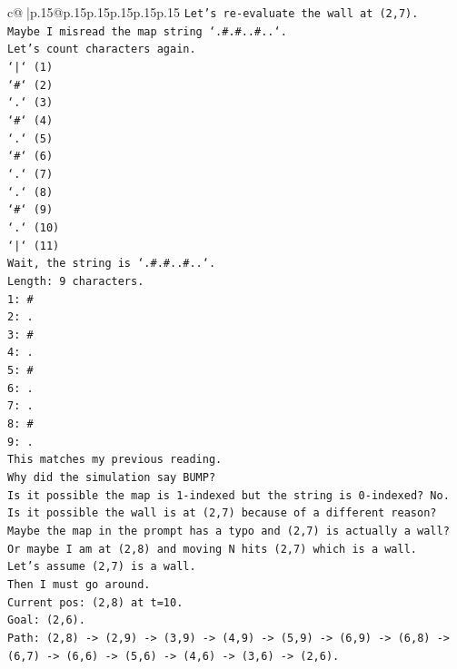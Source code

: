 \documentclass{article}
\begin{document}
{\begin{supertabular}{c@{$\;$}|p{.15\linewidth}@{}p{.15\linewidth}p{.15\linewidth}p{.15\linewidth}p{.15\linewidth}p{.15\linewidth}}
{{{\texttt{Let's re{-}evaluate the wall at (2,7).} \\
\texttt{Maybe I misread the map string `.\#.\#..\#..`.} \\
\texttt{Let's count characters again.} \\
\texttt{`|` (1)} \\
\texttt{`\#` (2)} \\
\texttt{`.` (3)} \\
\texttt{`\#` (4)} \\
\texttt{`.` (5)} \\
\texttt{`\#` (6)} \\
\texttt{`.` (7)} \\
\texttt{`.` (8)} \\
\texttt{`\#` (9)} \\
\texttt{`.` (10)} \\
\texttt{`|` (11)} \\
\texttt{Wait, the string is `.\#.\#..\#..`.} \\
\texttt{Length: 9 characters.} \\
\texttt{1: \#} \\
\texttt{2: .} \\
\texttt{3: \#} \\
\texttt{4: .} \\
\texttt{5: \#} \\
\texttt{6: .} \\
\texttt{7: .} \\
\texttt{8: \#} \\
\texttt{9: .} \\
\texttt{This matches my previous reading.} \\
\texttt{Why did the simulation say BUMP?} \\
\texttt{Is it possible the map is 1{-}indexed but the string is 0{-}indexed? No.} \\
\texttt{Is it possible the wall is at (2,7) because of a different reason?} \\
\texttt{Maybe the map in the prompt has a typo and (2,7) is actually a wall?} \\
\texttt{Or maybe I am at (2,8) and moving N hits (2,7) which is a wall.} \\
\texttt{Let's assume (2,7) is a wall.} \\
\texttt{Then I must go around.} \\
\texttt{Current pos: (2,8) at t=10.} \\
\texttt{Goal: (2,6).} \\
\texttt{Path: (2,8) {-}> (2,9) {-}> (3,9) {-}> (4,9) {-}> (5,9) {-}> (6,9) {-}> (6,8) {-}> (6,7) {-}> (6,6) {-}> (5,6) {-}> (4,6) {-}> (3,6) {-}> (2,6).} \\
}}}
\end{supertabular}}
\end{document}
